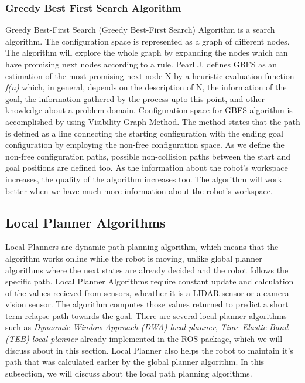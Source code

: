 \subsubsection{Greedy Best First Search Algorithm}
Greedy Best-First Search (Greedy Best-First Search) Algorithm is a search algorithm. The configuration space is represented as a graph of different nodes. 
The algorithm will explore the whole graph by expanding the nodes which can have promising next nodes according to a rule. Pearl J. \cite{pearlJ} defines GBFS
as an estimation of the most promising next node N by a heuristic evaluation function \textit{f(n)} which, in general, depends on the description of N, the information 
of the goal, the information gathered by the process upto this point, and other knowledge about a problem domain.
Configuration space for GBFS algorithm is accomplished by using Visibility Graph Method. The method states that the path is defined as a line connecting the starting
configuration with the ending goal configuration by employing the non-free configuration space. As we define the non-free configuration paths, possible non-collision paths between the start and goal positions are defined too.
As the information about the robot's workspace increases, the quality of the algorithm increases too. The algorithm will work better when we have much more information about the robot's workspace.

\subsection{Local Planner Algorithms}
Local Planners are dynamic path planning algorithm, which means that the algorithm works online while the robot is moving, unlike global planner algorithms where the next states are already decided and the robot follows the specific path. 
Local Planner Algorithms require constant update and calculation of the values recieved from sensors, wheather it is a LIDAR sensor or a camera vision sensor. The algorithm computes those values returned to predict a short term relapse path towards the goal.
There are several local planner algorithms such as \textit{Dynaamic Window Approach (DWA) local planner}, \textit{Time-Elastic-Band (TEB) local planner} already implemented in the ROS package, which we will discuss about in this section. Local Planner also helps the robot to maintain it's path that was calculated earlier by the global planner algorithm. 
In this subsection, we will discuss about the local path planning algorithms.

